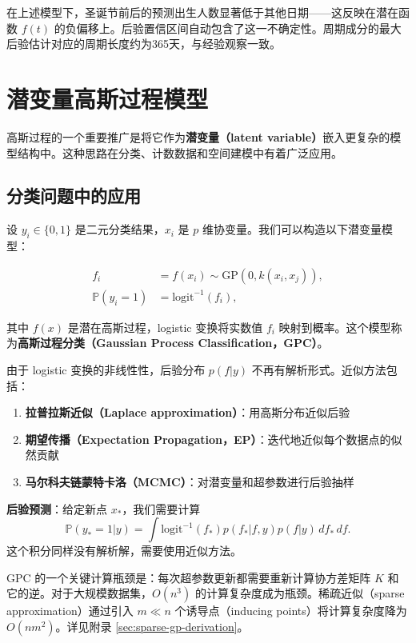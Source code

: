 \begin{Example}[生日数据的验证]\label{ex:gp-birthday-results}
  在上述模型下，圣诞节前后的预测出生人数显著低于其他日期——这反映在潜在函数 $f(t)$ 的负偏移上。后验置信区间自动包含了这一不确定性。周期成分的最大后验估计对应的周期长度约为365天，与经验观察一致。
\end{Example}

\section{潜变量高斯过程模型}\label{sec:latent-gp-models}

高斯过程的一个重要推广是将它作为\textbf{潜变量（latent variable）}嵌入更复杂的模型结构中。这种思路在分类、计数数据和空间建模中有着广泛应用。

\subsection{分类问题中的应用}

设 $y_i \in \{0, 1\}$ 是二元分类结果，$x_i$ 是 $p$ 维协变量。我们可以构造以下潜变量模型：

\begin{align}
f_i &= f(x_i) \sim \mathrm{GP}(0, k(x_i, x_j)), \label{eq:gp-class-latent} \\
\mathbb{P}(y_i = 1) &= \mathrm{logit}^{-1}(f_i), \label{eq:gp-class-link}
\end{align}

其中 $f(x)$ 是潜在高斯过程，logistic 变换将实数值 $f_i$ 映射到概率。这个模型称为\textbf{高斯过程分类（Gaussian Process Classification，GPC）}。

由于 logistic 变换的非线性性，后验分布 $p(f | y)$ 不再有解析形式。近似方法包括：

\begin{enumerate}
  \item \textbf{拉普拉斯近似（Laplace approximation）}：用高斯分布近似后验
  \item \textbf{期望传播（Expectation Propagation，EP）}：迭代地近似每个数据点的似然贡献
  \item \textbf{马尔科夫链蒙特卡洛（MCMC）}：对潜变量和超参数进行后验抽样
\end{enumerate}

\textbf{后验预测}：给定新点 $x_*$，我们需要计算
\[
\mathbb{P}(y_* = 1 | y) = \int \mathrm{logit}^{-1}(f_*) p(f_* | f, y) p(f | y) \, df_* \, df.
\]
这个积分同样没有解析解，需要使用近似方法。

\begin{Remark}
  GPC 的一个关键计算瓶颈是：每次超参数更新都需要重新计算协方差矩阵 $K$ 和它的逆。对于大规模数据集，$O(n^3)$ 的计算复杂度成为瓶颈。稀疏近似（sparse approximation）通过引入 $m \ll n$ 个诱导点（inducing points）将计算复杂度降为 $O(n m^2)$。详见附录 \cref{sec:sparse-gp-derivation}。
\end{Remark}

